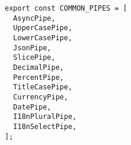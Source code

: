 \begin{verbatim}
export const COMMON_PIPES = [
  AsyncPipe,
  UpperCasePipe,
  LowerCasePipe,
  JsonPipe,
  SlicePipe,
  DecimalPipe,
  PercentPipe,
  TitleCasePipe,
  CurrencyPipe,
  DatePipe,
  I18nPluralPipe,
  I18nSelectPipe,
];
\end{verbatim}
